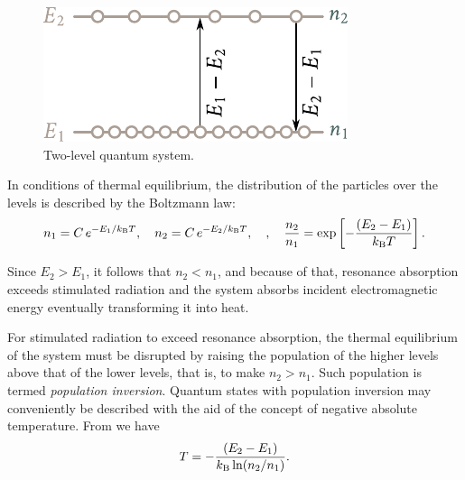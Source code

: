 \begin{figure}[t]
	\begin{center}
		\includegraphics[scale=1]{figures/ch_07/fig_7_25.pdf}
		\caption[]{Two-level quantum system.}
		\label{fig:7_25}
	\end{center}
	\vspace{-0.8cm}
\end{figure}

In conditions of thermal equilibrium, the distribution of the particles over the levels is described by the Boltzmann law:
\begin{equation}\label{eq:7_78}
    n_1 = C\,e^{-E_1/k_{\text{B}}T},\quad n_2 = C\,e^{-E_2/k_{\text{B}}T},\quad,\quad \frac{n_2}{n_1} = \exp\left[-\frac{\left(E_2-E_1\right)}{k_{\text{B}}T}\right].
\end{equation}

Since $E_2>E_1$, it follows that $n_2<n_1$, and because of that, resonance absorption exceeds stimulated radiation and the system absorbs incident electromagnetic energy eventually transforming it into heat.

For stimulated radiation to exceed resonance absorption, the thermal equilibrium of the system must be disrupted by raising the population of the higher levels above that of the lower levels, that is, to make $n_2>n_1$. Such population is termed \textit{population inversion}. Quantum states with population inversion may conveniently be described with the aid of the concept of negative absolute temperature. From  we have
\begin{equation}\label{eq:7_79}
    T = - \frac{\left(E_2-E_1\right)}{k_{\text{B}} \ln(n_2/n_1)}.
\end{equation}

